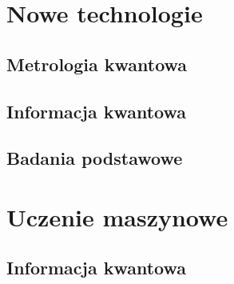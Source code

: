 \documentclass[a4paper,11pt]{article}
\begin{document}
\newpage 

\section{Nowe technologie}


\subsection{Metrologia kwantowa}

\subsection{Informacja kwantowa}

\subsection{Badania podstawowe}


\newpage 

\section{Uczenie maszynowe}

\subsection{Informacja kwantowa}
\end{document}
